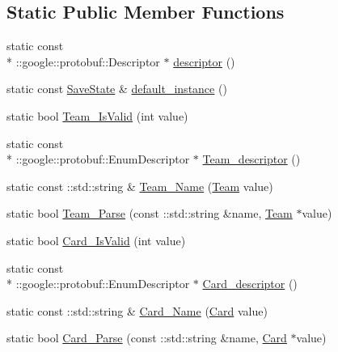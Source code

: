 \subsection*{Static Public Member Functions}
\begin{DoxyCompactItemize}
\item 
static const \\*
\-::google\-::protobuf\-::\-Descriptor $\ast$ \hyperlink{class_save_state_adeabd8286b7a96aa408e25103ce69324}{descriptor} ()
\item 
static const \hyperlink{class_save_state}{Save\-State} \& \hyperlink{class_save_state_a50e2fda7a2dd16fd8e2580ddad27bfdd}{default\-\_\-instance} ()
\item 
static bool \hyperlink{class_save_state_a9d2814056782aebf5a0969a1b2ea7bfd}{Team\-\_\-\-Is\-Valid} (int value)
\item 
static const \\*
\-::google\-::protobuf\-::\-Enum\-Descriptor $\ast$ \hyperlink{class_save_state_ac9730da2c7311dca20769725848b1a7e}{Team\-\_\-descriptor} ()
\item 
static const \-::std\-::string \& \hyperlink{class_save_state_a6dbe5ddcf5216a823468894bf6e563c2}{Team\-\_\-\-Name} (\hyperlink{savestate_8pb_8h_a4b014fc7586e8ed50211fe26dace5b8c}{Team} value)
\item 
static bool \hyperlink{class_save_state_a3473aa0fa96b04209b6bf7d5e4f7097b}{Team\-\_\-\-Parse} (const \-::std\-::string \&name, \hyperlink{savestate_8pb_8h_a4b014fc7586e8ed50211fe26dace5b8c}{Team} $\ast$value)
\item 
static bool \hyperlink{class_save_state_a2d605613ca0574e0de41bfed77586014}{Card\-\_\-\-Is\-Valid} (int value)
\item 
static const \\*
\-::google\-::protobuf\-::\-Enum\-Descriptor $\ast$ \hyperlink{class_save_state_a9fe9eda198f10326c5a855f7cc2a4d5f}{Card\-\_\-descriptor} ()
\item 
static const \-::std\-::string \& \hyperlink{class_save_state_a3d85b50bb3e31e375554edf8f3f26805}{Card\-\_\-\-Name} (\hyperlink{savestate_8pb_8h_a3d0d776b2483d298617cad1c15956ec7}{Card} value)
\item 
static bool \hyperlink{class_save_state_a568713cf178238759525c4a703fe55af}{Card\-\_\-\-Parse} (const \-::std\-::string \&name, \hyperlink{savestate_8pb_8h_a3d0d776b2483d298617cad1c15956ec7}{Card} $\ast$value)
\end{DoxyCompactItemize}
